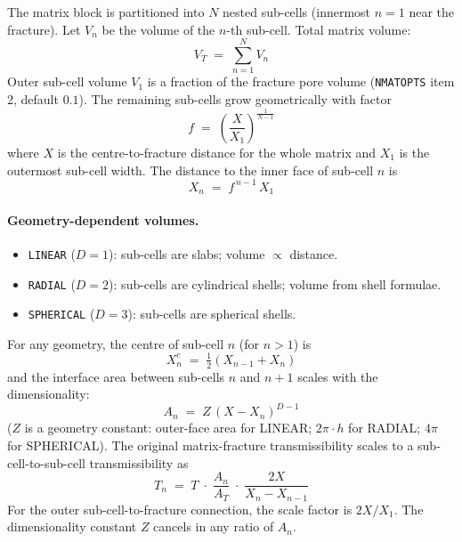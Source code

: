 \documentclass[11pt,a4paper]{article}
\newcommand{\kw}[1]{\texttt{#1}}
\begin{document}
The matrix block is partitioned into $N$ nested sub-cells (innermost $n=1$ near the fracture). Let $V_n$ be the volume of the $n$-th sub-cell. Total matrix volume:
\begin{equation}
V_T \;=\; \sum_{n=1}^{N} V_n
\label{eq:VT}
\end{equation}
Outer sub-cell volume $V_1$ is a fraction of the fracture pore volume (\kw{NMATOPTS} item 2, default $0.1$). The remaining sub-cells grow geometrically with factor
\begin{equation}
f \;=\; \left(\frac{X}{X_1}\right)^{\frac{1}{N-1}}
\label{eq:f-growth}
\end{equation}
where $X$ is the centre-to-fracture distance for the whole matrix and $X_1$ is the outermost sub-cell width. The distance to the inner face of sub-cell $n$ is
\begin{equation}
X_n \;=\; f^{\,n-1}\,X_1
\label{eq:Xn}
\end{equation}

\paragraph{Geometry-dependent volumes.}
\begin{itemize}
  \item \texttt{LINEAR} ($D=1$): sub-cells are slabs; volume $\propto$ distance.
  \item \texttt{RADIAL} ($D=2$): sub-cells are cylindrical shells; volume from shell formulae.
  \item \texttt{SPHERICAL} ($D=3$): sub-cells are spherical shells.
\end{itemize}
For any geometry, the centre of sub-cell $n$ (for $n>1$) is
\begin{equation}
X^c_n \;=\; \tfrac{1}{2}(X_{n-1} + X_n)
\label{eq:Xnc}
\end{equation}
and the interface area between sub-cells $n$ and $n+1$ scales with the dimensionality:
\begin{equation}
A_n \;=\; Z\,(X - X_n)^{D-1}
\label{eq:An}
\end{equation}
($Z$ is a geometry constant: outer-face area for LINEAR; $2\pi\cdot h$ for RADIAL; $4\pi$ for SPHERICAL). The original matrix-fracture transmissibility scales to a sub-cell-to-sub-cell transmissibility as
\begin{equation}
T_n \;=\; T \;\cdot\; \frac{A_n}{A_T}\;\cdot\;\frac{2X}{X_n - X_{n-1}}
\label{eq:Tn}
\end{equation}
For the outer sub-cell-to-fracture connection, the scale factor is $2X/X_1$. The dimensionality constant $Z$ cancels in any ratio of $A_n$.
\end{document}
